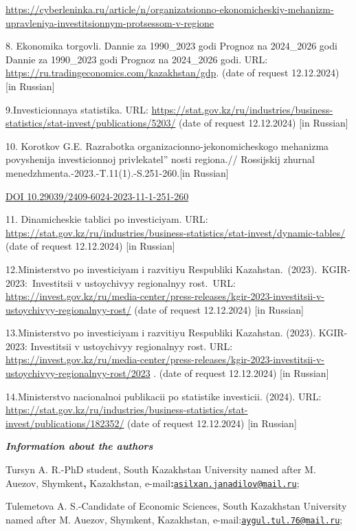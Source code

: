 \url{https://cyberleninka.ru/article/n/organizatsionno-ekonomicheskiy-mehanizm-upravleniya-investitsionnym-protsessom-v-regione}

8. Ekonomika torgovli. Dannie za 1990\_2023 godi \textbar{} Prognoz na
2024\_2026 godi Dannie za 1990\_2023 godi \textbar{} Prognoz na
2024\_2026 godi. URL:
\url{https://ru.tradingeconomics.com/kazakhstan/gdp}. (date of request
12.12.2024) {[}in Russian{]}

9.Investicionnaya statistika. URL:
\url{https://stat.gov.kz/ru/industries/business-statistics/stat-invest/publications/5203/}
(date of request 12.12.2024) {[}in Russian{]}

10. Korotkov G.E. Razrabotka organizacionno-jekonomicheskogo mehanizma
povyshenija investicionnoj
privlekatel'' nosti regiona.// Rossijskij
zhurnal menedzhmenta.-2023.-T.11(1).-S.251-260.{[}in Russian{]}

\href{https://doi.org/10.29039/2409-6024-2023-11-1-251-260}{DOI
10.29039/2409-6024-2023-11-1-251-260}

11. Dinamicheskie tablici po investiciyam. URL:
\url{https://stat.gov.kz/ru/industries/business-statistics/stat-invest/dynamic-tables/}
(date of request 12.12.2024) {[}in Russian{]}

12.Ministerstvo po investiciyam i razvitiyu Respubliki
Kazahstan.~(2023).~KGIR-2023:~Investitsii v ustoychivyy regionalnyy
rost.~URL:
\url{https://invest.gov.kz/ru/media-center/press-releases/kgir-2023-investitsii-v-ustoychivyy-regionalnyy-rost/}
(date of request 12.12.2024) {[}in Russian{]}

13.Ministerstvo po investiciyam i razvitiyu Respubliki Kazahstan.
(2023). KGIR-2023: Investitsii v ustoychivyy regionalnyy rost. URL:
\url{https://invest.gov.kz/ru/media-center/press-releases/kgir-2023-investitsii-v-ustoychivyy-regionalnyy-rost/2023}
. (date of request 12.12.2024) {[}in Russian{]}

14.Ministerstvo nacionalnoi publikacii po statistike investicii. (2024).
URL:
\url{https://stat.gov.kz/ru/industries/business-statistics/stat-invest/publications/182352/}
(date of request 12.12.2024) {[}in Russian{]}

\emph{{\bfseries Information about the authors}}

Tursyn A. R.-PhD student, South Kazakhstan University named after M.
Auezov, Shymkent{\bfseries ,} Kazakhstan,
e-mail{\bfseries :}\href{mailto:asilxan.janadilov@mail.ru}{\nolinkurl{asilxan.janadilov@mail.ru}};

Tulemetova A. S.-Candidate of Economic Sciences, South Kazakhstan
University named after M. Auezov, Shymkent, Kazakhstan,
e-mail:\href{mailto:aygul.tul.76@mail.ru}{\nolinkurl{aygul.tul.76@mail.ru}};

